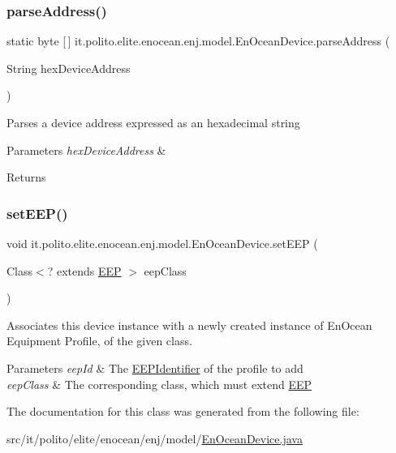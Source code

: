 \subsubsection{\texorpdfstring{parse\+Address()}{parseAddress()}}
{\footnotesize\ttfamily static byte \mbox{[}$\,$\mbox{]} it.\+polito.\+elite.\+enocean.\+enj.\+model.\+En\+Ocean\+Device.\+parse\+Address (\begin{DoxyParamCaption}\item[{String}]{hex\+Device\+Address }\end{DoxyParamCaption})\hspace{0.3cm}{\ttfamily [static]}}

Parses a device address expressed as an hexadecimal string


\begin{DoxyParams}{Parameters}
{\em hex\+Device\+Address} & \\
\hline
\end{DoxyParams}
\begin{DoxyReturn}{Returns}

\end{DoxyReturn}
\hypertarget{classit_1_1polito_1_1elite_1_1enocean_1_1enj_1_1model_1_1_en_ocean_device_a80ebd2e361f82b0d7ade169d2690dcdf}{}\label{classit_1_1polito_1_1elite_1_1enocean_1_1enj_1_1model_1_1_en_ocean_device_a80ebd2e361f82b0d7ade169d2690dcdf} 
\subsubsection{\texorpdfstring{set\+E\+E\+P()}{setEEP()}}
{\footnotesize\ttfamily void it.\+polito.\+elite.\+enocean.\+enj.\+model.\+En\+Ocean\+Device.\+set\+E\+EP (\begin{DoxyParamCaption}\item[{Class$<$? extends \hyperlink{classit_1_1polito_1_1elite_1_1enocean_1_1enj_1_1eep_1_1_e_e_p}{E\+EP} $>$}]{eep\+Class }\end{DoxyParamCaption})}

Associates this device instance with a newly created instance of En\+Ocean Equipment Profile, of the given class.


\begin{DoxyParams}{Parameters}
{\em eep\+Id} & The \hyperlink{}{E\+E\+P\+Identifier} of the profile to add \\
\hline
{\em eep\+Class} & The corresponding class, which must extend \hyperlink{}{E\+EP} \\
\hline
\end{DoxyParams}


The documentation for this class was generated from the following file\+:\begin{DoxyCompactItemize}
\item 
src/it/polito/elite/enocean/enj/model/\hyperlink{_en_ocean_device_8java}{En\+Ocean\+Device.\+java}\end{DoxyCompactItemize}
